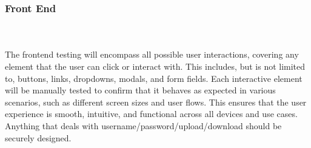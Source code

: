\documentclass[12pt, titlepage]{article}
\begin{document}
\subsubsection{Front End}

\\\\
  The frontend testing will encompass all possible user interactions, covering any element that the user can click or interact with. This includes, but is not limited to, buttons, links, dropdowns, modals, and form fields. Each interactive element will be manually tested to confirm that it behaves as expected in various scenarios, such as different screen sizes and user flows. This ensures that the user experience is smooth, intuitive, and functional across all devices and use cases. Anything that deals with username/password/upload/download should be securely designed.
\end{document}
